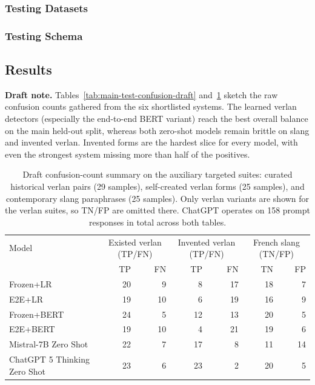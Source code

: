 \documentclass[12pt]{article}
\begin{document}
\subsubsection{Testing Datasets}
\subsubsection{Testing Schema}

\subsection{Results}
\textbf{Draft note.} Tables~\ref{tab:main-test-confusion-draft} and~\ref{tab:aux-test-confusion-draft} sketch the raw confusion counts gathered from the six shortlisted systems.  The learned verlan detectors (especially the end-to-end BERT variant) reach the best overall balance on the main held-out split, whereas both zero-shot models remain brittle on slang and invented verlan.  Invented forms are the hardest slice for every model, with even the strongest system missing more than half of the positives.



\begin{table}[H]
    \centering
    \footnotesize
    \begin{tabular}{lrrrrrr}
        \hline
        Model & \multicolumn{2}{c}{Existed verlan (TP/FN)} & \multicolumn{2}{c}{Invented verlan (TP/FN)} & \multicolumn{2}{c}{French slang (TN/FP)} \\
         & TP & FN & TP & FN & TN & FP \\
        \hline
        Frozen+LR & 20 & 9 & 8 & 17 & 18 & 7 \\
        E2E+LR & 19 & 10 & 6 & 19 & 16 & 9 \\
        Frozen+BERT & 24 & 5 & 12 & 13 & 20 & 5 \\
        E2E+BERT & 19 & 10 & 4 & 21 & 19 & 6 \\
        Mistral-7B Zero Shot & 22 & 7 & 17 & 8 & 11 & 14 \\
        ChatGPT 5 Thinking Zero Shot & 23 & 6 & 23 & 2 & 20 & 5 \\
        \hline
    \end{tabular}
    \caption{Draft confusion-count summary on the auxiliary targeted suites: curated historical verlan pairs (29 samples), self-created verlan forms (25 samples), and contemporary slang paraphrases (25 samples).  Only verlan variants are shown for the verlan suites, so TN/FP are omitted there.  ChatGPT operates on 158 prompt responses in total across both tables.}
    \label{tab:aux-test-confusion-draft}
\end{table}
\end{document}
